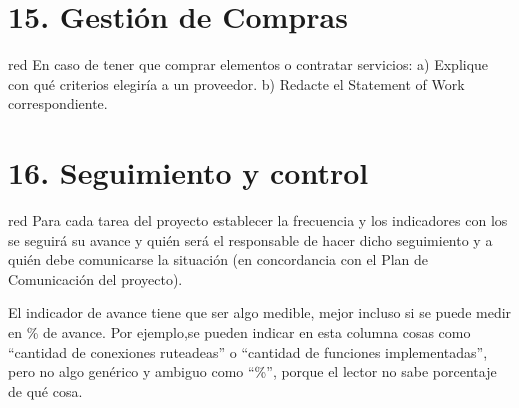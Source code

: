 \documentclass[11pt]{charter}
\begin{document}
\begin{table}[htpb]
\centering
{}
\end{table}

\section{15. Gestión de Compras}
\label{sec:compras}

\begin{consigna}{red}
En caso de tener que comprar elementos o contratar servicios:
a) Explique con qué criterios elegiría a un proveedor.
b) Redacte el Statement of Work correspondiente.
\end{consigna}

\section{16. Seguimiento y control}
\label{sec:seguimiento}

\begin{consigna}{red}
Para cada tarea del proyecto establecer la frecuencia y los indicadores con los se seguirá su avance y quién será el responsable de hacer dicho seguimiento y a quién debe comunicarse la situación (en concordancia con el Plan de Comunicación del proyecto).

El indicador de avance tiene que ser algo medible, mejor incluso si se puede medir en \% de avance. Por ejemplo,se pueden indicar en esta columna cosas como ``cantidad de conexiones ruteadeas'' o ``cantidad de funciones implementadas'', pero no algo genérico y ambiguo como ``\%'', porque el lector no sabe porcentaje de qué cosa.

\end{consigna}
\end{document}
